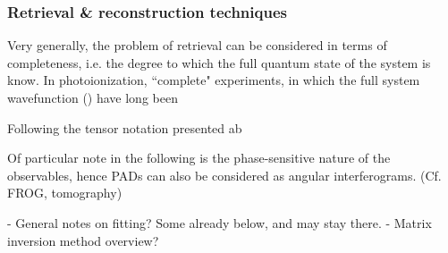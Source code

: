 \subsubsection{Retrieval \& reconstruction techniques}

Very generally, the problem of retrieval can be considered in terms of completeness, i.e. the degree to which the full quantum state of the system is know. In photoionization, ``complete" experiments, in which the full system wavefunction () have long been

Following the tensor notation presented ab

Of particular note in the following is the phase-sensitive nature of the observables, hence PADs can also be considered as angular interferograms. (Cf. FROG, tomography)

- General notes on fitting? Some already below, and may stay there.
- Matrix inversion method overview?